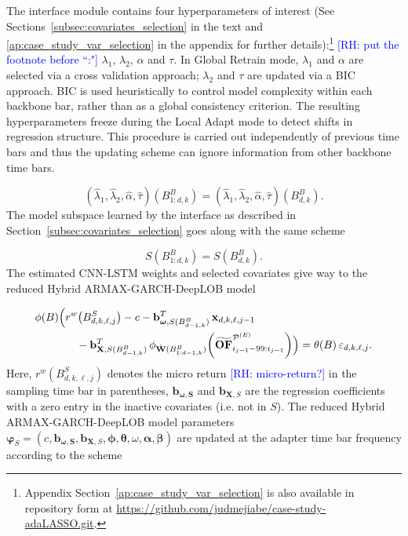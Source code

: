 \documentclass[10pt,a4paper,oneside]{article}
\newcommand{\rh}[1]{\textcolor{blue}{\textsf{[RH: #1]}}}
\begin{document}
The interface module contains four hyperparameters of interest (See Sections~\ref{subsec:covariates_selection} in the text and \ref{ap:case_study_var_selection} in the appendix for further details):\footnote{Appendix Section~\ref{ap:case_study_var_selection} is also available in repository form at \url{https://github.com/judmejiabe/case-study-adaLASSO.git}.} \rh{put the footnote before ``:"} $\lambda_1$, $\lambda_2$, $\alpha$ and $\tau$. In Global Retrain mode, \(\lambda_1\) and \(\alpha\) are selected via a cross validation approach; \(\lambda_2\) and \(\tau\) are updated via a BIC approach. BIC is used heuristically to control model complexity within each backbone bar, rather than as a global consistency criterion. The resulting hyperparameters freeze during the Local Adapt mode to detect shifts in regression structure. This procedure is carried out independently of previous time bars and thus the updating scheme can ignore information from other backbone time bars.

$$
(\hat{\lambda}_1, \hat{\lambda}_2, \hat{\alpha}, \hat{\tau})(B^{B}_{1:d, k}) = (\hat{\lambda}_1, \hat{\lambda}_2, \hat{\alpha}, \hat{\tau})(B^{B}_{d, k}).
$$
The model subspace learned by the interface as described in Section~\ref{subsec:covariates_selection} goes along with the same scheme

$$
S(B^B_{1:d, k}) = S(B^B_{d, k}).
$$
The estimated CNN-LSTM weights and selected covariates give way to the reduced Hybrid ARMAX-GARCH-DeepLOB model

\begin{align*}
\phi(B)\Bigl(&r^w\bigl(B^{S}_{d,k,\ell,j}\bigr) - c 
    - \mathbf{b}_{\boldsymbol{\omega}, S(B^B_{d-1,k})}^{T}\,\mathbf{x}_{d,k,\ell,j-1} \notag\\
    &\quad - \mathbf{b}^T_{\mathbf{X}, S(B^B_{d-1,k})}\,
      \phi_{\hat{\mathbf{W}}(B^B_{1:d-1,k})}\!\left(\widetilde{\mathbf{OF}}^{\mathcal{P}^{(E)}}_{i_{j-1}-99:i_{j-1}}\right)
\Bigr) = \theta(B)\,\varepsilon_{d,k,\ell,j}.
\end{align*}
Here, $r^w(B^{S}_{d,k,\ell,j})$ denotes the micro return \rh{micro-return?} in the sampling time bar in parentheses, $\mathbf{b}_{\boldsymbol{\omega, S}}$ and $\mathbf{b}_{\mathbf{X}, S}$ are the regression coefficients with a zero entry in the inactive covariates (i.e. not in $S$). The reduced Hybrid ARMAX-GARCH-DeepLOB model parameters $\boldsymbol{\varphi}_{S} = (c, \mathbf{b}_{\boldsymbol{\omega, S}}, \mathbf{b}_{\mathbf{X}, S}, \boldsymbol{\phi}, \boldsymbol{\theta}, \omega, \boldsymbol{\alpha}, \boldsymbol{\beta})$ are updated at the adapter time bar frequency according to the scheme
\end{document}
